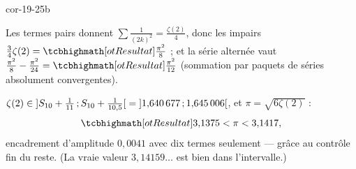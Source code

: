 \begin{blocLivre}{cor-19-25b}
\begin{corrigeSuite}
\begin{questions}[start=7]
  \item Les termes pairs donnent
    $\sum\frac{1}{(2k)^{2}}=\frac{\zeta(2)}{4}$, donc les impairs
    $\frac34\zeta(2)=\res{\frac{\pi^{2}}{8}}$ ; et la série alternée vaut
    $\frac{\pi^{2}}{8}-\frac{\pi^{2}}{24}=\res{\frac{\pi^{2}}{12}}$
    (sommation par paquets de séries absolument convergentes).
  \item $\zeta(2)\in\mathopen{]}S_{10}+\frac1{11}\,{;}\,S_{10}+\frac{1}{10{,}5}\mathclose{[}
    =\mathopen{]}1{,}640\,677\,{;}\,1{,}645\,006\mathclose{[}$, et $\pi=\sqrt{6\zeta(2)}$ :
    \[
    \res{3{,}1375<\pi<3{,}1417},
    \]
    encadrement d'amplitude $0{,}0041$ avec dix termes seulement — grâce au
    contrôle fin du reste. (La vraie valeur $3{,}14159\dots$ est bien dans
    l'intervalle.)
\end{questions}
\end{corrigeSuite}
\end{blocLivre}
